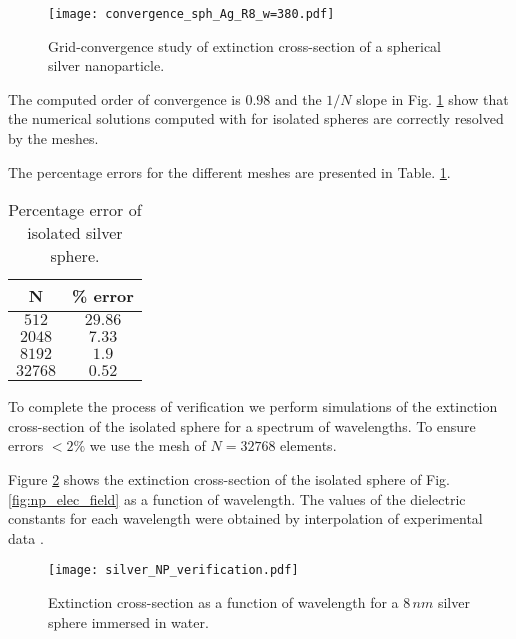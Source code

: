 \begin{figure}[h] %
   \centering
   \texttt{[image: convergence\_sph\_Ag\_R8\_w=380.pdf]} 
   \caption{Grid-convergence study of extinction cross-section of a spherical silver
            nanoparticle.}
   \label{fig:error_sphere_Ag}
\end{figure}

The computed order of convergence is $0.98$ and the $1/N$ slope in Fig. \ref{fig:error_sphere_Ag}
show that the numerical solutions computed with \pygbe for isolated spheres are
correctly resolved by the meshes.

The percentage errors for the different meshes are presented in Table. \ref{table:err_iso_sphere}.

\begin{table}[h]
    \centering
    \caption{\label{table:err_iso_sphere} Percentage error of isolated silver sphere.} 
    \begin{tabular}{c c}
    \hline%
    N & \% error \\
    \hline%
     $512$ & $29.86$ \\
     $2048$ & $7.33$ \\
     $8192$ & $1.9$ \\
     $32768$ & $0.52$ \\
    \hline%
    \end{tabular}
\end{table}


To complete the process of verification we perform simulations of the extinction 
cross-section of the isolated sphere for a spectrum of wavelengths. To ensure 
errors $<2\%$ we use the mesh of $N=32768$ elements. 

Figure \ref{fig:verif_sphere} shows the extinction cross-section of the isolated
sphere of Fig.\ref{fig:np_elec_field} as a function of wavelength. The values of 
the dielectric constants for each wavelength were obtained by interpolation of 
experimental data \cite{JohnsonChristy1972, HaleQuerry1972}.


\begin{figure}[h] %
   \centering
   \texttt{[image: silver\_NP\_verification.pdf]} 
   \caption{Extinction cross-section as a function of wavelength for a $8 \, nm$
            silver sphere immersed in water.}
   \label{fig:verif_sphere}
\end{figure}

